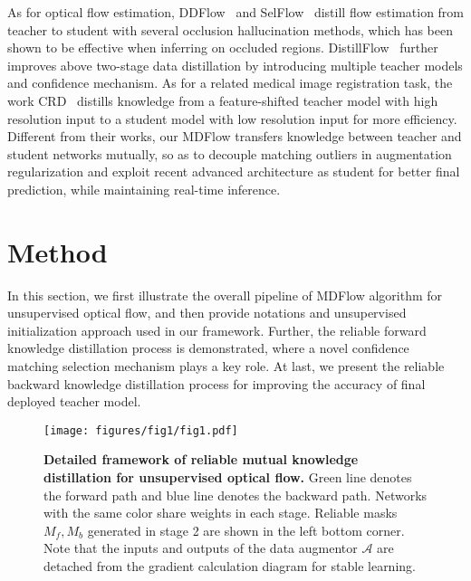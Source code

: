 \documentclass[lettersize,journal]{IEEEtran}
\begin{document}
As for optical flow estimation, DDFlow~\cite{Liu:2019:DDFlow} and SelFlow~\cite{Liu:2019:SelFlow} distill flow estimation from teacher to student with several occlusion hallucination methods, which has been shown to be effective when inferring on occluded regions. DistillFlow~\cite{9444870} further improves above two-stage data distillation by introducing multiple teacher models and confidence mechanism. As for a related medical image registration task, the work CRD~\cite{9782430} distills knowledge from a feature-shifted teacher model with high resolution input to a student model with low resolution input for more efficiency. Different from their works, our MDFlow transfers knowledge between teacher and student networks mutually, so as to decouple matching outliers in augmentation regularization and exploit recent advanced architecture as student for better final prediction, while maintaining real-time inference.


\section{Method}
In this section, we first illustrate the overall pipeline of MDFlow algorithm for unsupervised optical flow, and then provide notations and unsupervised initialization approach used in our framework. Further, the reliable forward knowledge distillation process is demonstrated, where a novel confidence matching selection mechanism plays a key role. At last, we present the reliable backward knowledge distillation process for improving the accuracy of final deployed teacher model.

\begin{figure*}[t]
	\centering
	\texttt{[image: figures/fig1/fig1.pdf]}
	\caption{\textbf{Detailed framework of reliable mutual knowledge distillation for unsupervised optical flow.} \textcolor{mygreen}{Green line} denotes the forward path and \textcolor{myblue}{blue line} denotes the backward path. Networks with the same color share weights in each stage. Reliable masks $M_f, M_b$ generated in stage 2 are shown in the left bottom corner. Note that the inputs and outputs of the data augmentor $\mathcal{A}$ are detached from the gradient calculation diagram for stable learning.}
	\label{fig:1}
\end{figure*}
\end{document}
